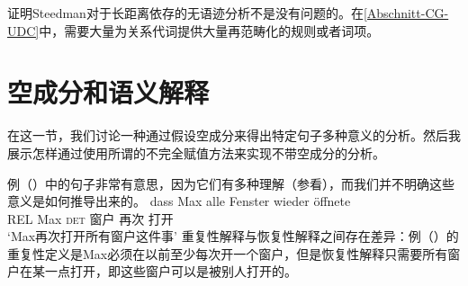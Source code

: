 \citet{Pollard88a}证明Steedman对于长距离依存的无语迹分析不是没有问题的。在\ref{Abschnitt-CG-UDC}中，需要大量为关系代词提供大量再范畴化的规则或者词项。

\section{空成分和语义解释}
\label{Abschnitt-leere-Elemente-Semantik}
\label{sec-MRS-wieder}

在这一节，我们讨论一种通过假设空成分来得出特定句子多种意义的分析。然后我展示怎样通过使用所谓的不完全赋值方法来实现不带空成分的分析。

例（）中的句子非常有意思，因为它们有多种理解（参看\citealp[\S~5.6]{Dowty79a}），而我们并不明确这些意义是如何推导出来的。
\ea
\label{ex-alle-wieder}
\gll dass Max alle Fenster wieder öffnete\\
	 REL Max \textsc{det} 窗户 再次 打开\\
\glt `Max再次打开所有窗户这件事'
\z
重复性解释与恢复性解释之间存在差异：例（）的重复性定义是Max必须在以前至少每次开一个窗户，但是恢复性解释只需要所有窗户在某一点打开，即这些窗户可以是被别人打开的。

